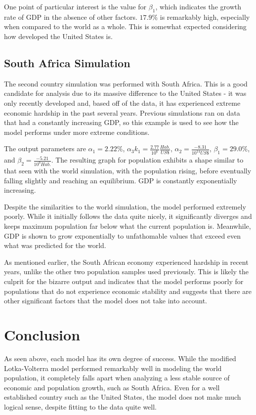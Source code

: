\documentclass[a4paper]{article}
\begin{document}
One point of particular interest is the value for $\beta_1$, which indicates the growth rate of GDP in the absence of other factors. $17.9\%$ is remarkably high, especially when compared to the world as a whole. This is somewhat expected considering how developed the United States is. 

\subsection{South Africa Simulation}

The second country simulation was performed with South Africa. This is a good candidate for analysis due to its massive difference to the United States - it was only recently developed and, based off of the data, it has experienced extreme economic hardship in the past several years. Previous simulations ran on data that had a constantly increasing GDP, so this example is used to see how the model performs under more extreme conditions.

The output parameters are $\alpha_1 = 2.22\%$, $\alpha_3 k_1 = \frac{2.77}{10^{6}}\frac{Hab.}{US \$}$, $\alpha_2 = \frac{-8.31}{10^{14} US\$}$, $\beta_1 = 29.0\%$, and $\beta_2 = \frac{-5.21}{10^{9} Hab.}$. The resulting graph for population exhibits a shape similar to that seen with the world simulation, with the population rising, before eventually falling slightly and reaching an equilibrium. GDP is constantly exponentially increasing.

Despite the similarities to the world simulation, the model performed extremely poorly. While it initially follows the data quite nicely, it significantly diverges and keeps maximum population far below what the current population is. Meanwhile, GDP is shown to grow exponentially to unfathomable values that exceed even what was predicted for the world.

As mentioned earlier, the South African economy experienced hardship in recent years, unlike the other two population samples used previously. This is likely the culprit for the bizarre output and indicates that the model performs poorly for populations that do not experience economic stability and suggests that there are other significant factors that the model does not take into account.

\section{Conclusion}

As seen above, each model has its own degree of success. While the modified Lotka-Volterra model performed remarkably well in modeling the world population, it completely falls apart when analyzing a less stable source of economic and population growth, such as South Africa. Even for a well established country such as the United States, the model does not make much logical sense, despite fitting to the data quite well. 
\end{document}
